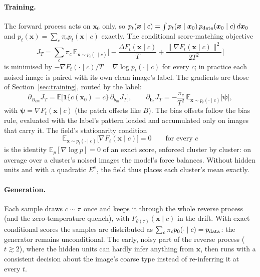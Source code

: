 \documentclass[11pt,a4paper]{article}
\newcommand{\vx}{\bm{x}}
\newcommand{\E}{\mathbb{E}}
\newcommand{\Ev}{E^{\mathrm{v}}}
\newcommand{\grad}{\nabla}
\begin{document}
\paragraph{Training.} The forward process acts on $\vx_0$ only, so
$p_t(\vx\mid c)=\int p_t(\vx\mid\vx_0)\,p_{\rm data}(\vx_0\mid c)\,d\vx_0$ and $p_t(\vx)=\sum_c\pi_cp_t(\vx\mid c)$ exactly.
The conditional score-matching objective
\begin{equation}
  J_T=\sum_c\pi_c\,\E_{\vx\sim p_t(\cdot\mid c)}\Big[-\frac{\Delta F_t(\vx\mid c)}{T}+\frac{\|\grad F_t(\vx\mid c)\|^2}{2T^2}\Big]
\end{equation}
is minimised by $-\grad F_t(\cdot\mid c)/T=\grad\log p_t(\cdot\mid c)$ for every $c$; in practice each noised image is
paired with its own clean image's label. The gradients are those of Section~\ref{sec:training}, routed by the label:
\begin{equation}
  \partial_{B_{cm}}J_T=\E\big[\mathbf 1\{c(\vx_0)=c\}\,\partial_{b_m}J_T\big],\qquad
  \partial_{\bm h_c}J_T=-\frac{\pi_c}{T^2}\,\E_{\vx\sim p_t(\cdot\mid c)}\big[\bm\psi\big],
\end{equation}
with $\bm\psi=\grad F_t(\vx\mid c)$ (the patch offsets like $B$). The bias offsets follow the bias rule, evaluated with
the label's pattern loaded and accumulated only on images that carry it. The field's stationarity condition
\begin{equation}
  \E_{\vx\sim p_t(\cdot\mid c)}\big[\grad F_t(\vx\mid c)\big]=0\qquad\text{for every }c
\end{equation}
is the identity $\E_p[\grad\log p]=0$ of an exact score, enforced cluster by cluster: on average over a cluster's
noised images the model's force balances. Without hidden units and with a quadratic $\Ev$, the field thus places
each cluster's mean exactly.

\paragraph{Generation.} Each sample draws $c\sim\pi$ once and keeps it through the whole reverse process (and the
zero-temperature quench), with $F_{\theta(\tau)}(\vx\mid c)$ in the drift. With exact conditional scores the samples
are distributed as $\sum_c\pi_cp_0(\cdot\mid c)=p_{\rm data}$: the generator remains unconditional. The early, noisy
part of the reverse process ($t\gtrsim2$), where the hidden units can hardly infer anything from $\vx$, then runs
with a consistent decision about the image's coarse type instead of re-inferring it at every $t$.
\end{document}
